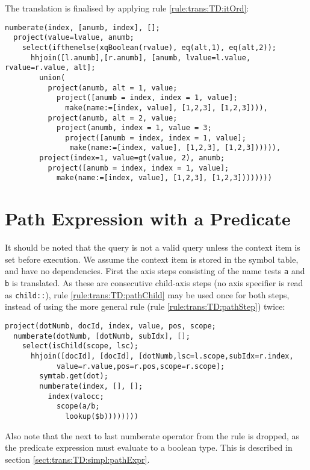 The translation is finalised by applying rule \ref{rule:trans:TD:itOrd}:

\begin{Verbatim}
numberate(index, [anumb, index], [];
  project(value=lvalue, anumb;
    select(ifthenelse(xqBoolean(rvalue), eq(alt,1), eq(alt,2));
      hhjoin([l.anumb],[r.anumb], [anumb, lvalue=l.value, rvalue=r.value, alt];
        union(
          project(anumb, alt = 1, value;
            project([anumb = index, index = 1, value];
              make(name:=[index, value], [1,2,3], [1,2,3]))),
          project(anumb, alt = 2, value;
            project(anumb, index = 1, value = 3;
              project([anumb = index, index = 1, value];
               make(name:=[index, value], [1,2,3], [1,2,3]))))),
        project(index=1, value=gt(value, 2), anumb;
          project([anumb = index, index = 1, value];
            make(name:=[index, value], [1,2,3], [1,2,3])))))))
\end{Verbatim}

\section{Path Expression with a Predicate}
\label{appendix:transl:pathPred}

It should be noted that the query is not a valid query unless the context item is set before execution. We assume
the context item is stored in the symbol table, and have no dependencies. First the axis steps consisting of the
name tests \texttt{a} and \texttt{b} is translated. As these are consecutive child-axis steps (no axis specifier
is read as \texttt{child::}), rule \ref{rule:trans:TD:pathChild} may be used once for both steps, instead of using
the more general rule (rule \ref{rule:trans:TD:pathStep}) twice:
\begin{Verbatim}
project(dotNumb, docId, index, value, pos, scope;
  numberate(dotNumb, [dotNumb, subIdx], [];
    select(isChild(scope, lsc);
      hhjoin([docId], [docId], [dotNumb,lsc=l.scope,subIdx=r.index,
            value=r.value,pos=r.pos,scope=r.scope];
        symtab.get(dot);
        numberate(index, [], [];
          index(valocc;
            scope(a/b;
              lookup($b))))))))
\end{Verbatim}
Also note that the next to last \textsf{numberate} operator from the rule is dropped, as the predicate expression
must evaluate to a boolean type. This is described in section \ref{sect:trans:TD:simpl:pathExpr}.

